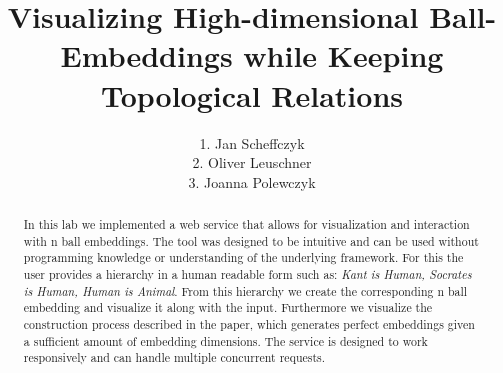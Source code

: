 \documentclass[a4paper, twoside]{report}
\title{Visualizing High-dimensional Ball-Embeddings while Keeping Topological Relations}
\author{1. Jan Scheffczyk \\ 2. Oliver Leuschner \\ 3. Joanna Polewczyk}
\begin{document}


\begin{abstract}
In this lab we implemented a web service that allows for visualization and interaction with n ball embeddings. The tool was designed to be intuitive and can be used without programming knowledge or understanding of the underlying framework. For this the user provides a hierarchy in a human readable form such as: \textit{Kant is Human, Socrates is Human, Human is Animal}. From this hierarchy we create the corresponding n ball embedding and visualize it along with the input. Furthermore we visualize the construction process described in the paper, which generates perfect embeddings given a sufficient amount of embedding dimensions. The service is designed to work responsively and can handle multiple concurrent requests.
\end{abstract}


\tableofcontents
\listoffigures











\end{document}
